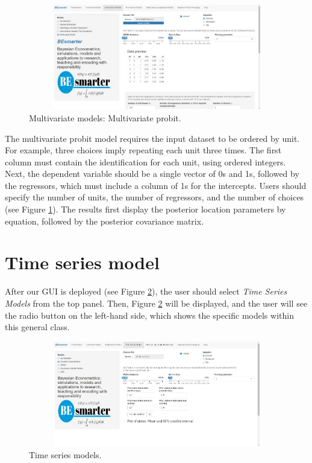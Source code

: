 \begin{figure}
	\includegraphics[width=340pt, height=130pt]{Chapters/chapterGUI/figures/Figure7.jpg}
	\caption[List of figure caption goes here]{Multivariate models: Multivariate probit.}\label{fig67}
\end{figure} 

The multivariate probit model requires the input dataset to be ordered by unit. For example, three choices imply repeating each unit three times. The first column must contain the identification for each unit, using ordered integers. Next, the dependent variable should be a single vector of 0s and 1s, followed by the regressors, which must include a column of 1s for the intercepts. Users should specify the number of units, the number of regressors, and the number of choices (see Figure \ref{fig67}). The results first display the posterior location parameters by equation, followed by the posterior covariance matrix.

\section{Time series model}\label{secGUI4}
After our GUI is deployed (see Figure \ref{fig8a}), the user should select \textit{Time Series Models} from the top panel. Then, Figure \ref{fig8a} will be displayed, and the user will see the radio button on the left-hand side, which shows the specific models within this general class.

\begin{figure}
	\includegraphics[width=340pt, height=130pt]{Chapters/chapterGUI/figures/Figure8a.jpg}
	\caption[List of figure caption goes here]{Time series models.}\label{fig8a}
\end{figure} 

